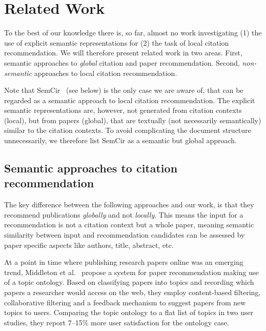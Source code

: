 \chapter{Related Work}\label{chap:relatedwork}

To the best of our knowledge there is, so far, almost no work investigating (1) the use of explicit semantic representations for (2) the task of local citation recommendation. We will therefore present related work in two areas. First, semantic approaches to \emph{global} citation and paper recommendation. Second, \emph{non-semantic} approaches to local citation recommendation.

Note that SemCir~\cite{Zarrinkalam2013} (see below) is the only case we are aware of, that can be regarded as a semantic approach to local citation recommendation. The explicit semantic representations are, however, not generated from citation contexts (local), but from papers (global), that are textually (not necessarily semantically) similar to the citation contexts. To avoid complicating the document structure unnecessarily, we therefore list SemCir as a semantic but global approach.

\section{Semantic approaches to citation recommendation}

The key difference between the following approaches and our work, is that they recommend publications \emph{globally} and not \emph{locally}. This means the input for a recommendation is not a citation context but a whole paper, meaning semantic similarity between input and recommendation candidates can be assessed by paper specific aspects like authors, title, abstract, etc.

At a point in time where publishing research papers online was an emerging trend, Middleton et al.~\cite{Middleton2001} propose a system for paper recommendation making use of a topic ontology. Based on classifying papers into topics and recording which papers a researcher would access on the web, they employ content-based filtering, collaborative filtering and a feedback mechanism to suggest papers from new topics to users. Comparing the topic ontology to a flat list of topics in two user studies, they report 7--15\% more user satisfaction for the ontology case.

